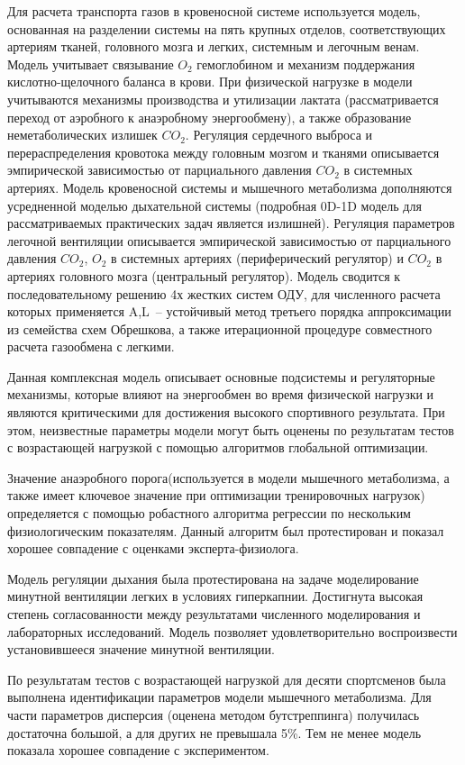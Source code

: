 Для расчета транспорта газов в кровеносной системе используется модель, основанная на разделении системы на пять крупных отделов, соответствующих артериям тканей, головного мозга и легких, системным и легочным венам. Модель учитывает связывание $O_{2}$ гемоглобином и механизм поддержания кислотно-щелочного баланса в крови. При физической нагрузке в модели учитываются механизмы производства и утилизации лактата (рассматривается переход от аэробного к анаэробному энергообмену), а также образование неметаболических излишек $CO_{2}$. Регуляция сердечного выброса и перераспределения кровотока между головным мозгом и тканями описывается эмпирической зависимостью от парциального давления $CO_{2}$ в системных артериях. Модель кровеносной системы и мышечного метаболизма дополняются усредненной моделью дыхательной системы (подробная 0D-1D модель для рассматриваемых практических задач является излишней). Регуляция параметров легочной вентиляции описывается эмпирической зависимостью от парциального давления $CO_{2}$, $O_{2}$ в системных артериях (периферический регулятор) и $CO_{2}$ в артериях головного мозга (центральный регулятор). Модель сводится к последовательному решению 4х жестких систем ОДУ, для численного расчета которых применяется A,L~-- устойчивый метод третьего порядка аппроксимации из семейства схем Обрешкова, а также итерационной процедуре совместного расчета газообмена с легкими. 

Данная комплексная модель описывает основные подсистемы и регуляторные механизмы, которые влияют на энергообмен во время физической нагрузки и являются критическими для достижения высокого спортивного результата. При этом, неизвестные параметры модели могут быть оценены по результатам тестов с возрастающей нагрузкой с помощью алгоритмов глобальной оптимизации.

Значение анаэробного порога(используется в модели мышечного метаболизма, а также имеет ключевое значение при оптимизации тренировочных нагрузок) определяется с помощью робастного алгоритма регрессии по нескольким физиологическим показателям. Данный алгоритм был протестирован и показал хорошее совпадение с оценками эксперта-физиолога.

Модель регуляции дыхания была протестирована на задаче моделирование минутной вентиляции легких в условиях гиперкапнии. Достигнута высокая степень согласованности между результатами численного моделирования и лабораторных исследований. Модель позволяет удовлетворительно воспроизвести установившееся значение минутной вентиляции. 

По результатам тестов с возрастающей нагрузкой для десяти спортсменов была выполнена идентификации параметров модели мышечного метаболизма. Для части параметров дисперсия (оценена методом бутстреппинга) получилась достаточна большой, а для других не превышала 5\%. Тем не менее модель показала хорошее совпадение с экспериментом.

\clearpage